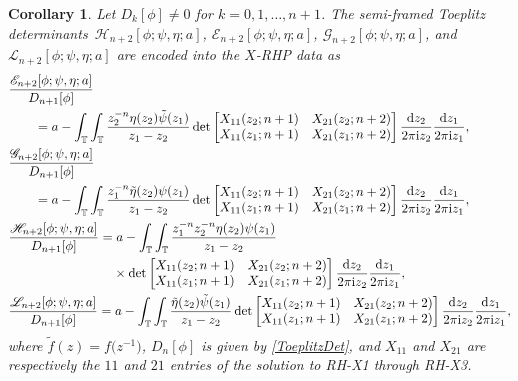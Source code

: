 \documentclass[pdftex]{sigma}
\numberwithin{equation}{section}
\newtheorem{Corollary}[Theorem]{Corollary}
\newcommand{\T}{{\mathbb T}}
\newcommand{\ii}{{\rm i}}
\newcommand{\dd}{{\rm d}}
\begin{document}
	\begin{Corollary}\label{EGL and RHP intro}
		Let $D_k[\phi] \neq 0$ for $k=0,1,\dots, n+1$. The semi-framed Toeplitz determinants~${\mathscr{H}_{n+2}[\phi; \psi, \eta ;a]}$, $\mathscr{E}_{n+2}[\phi; \psi, \eta ;a]$, $\mathscr{G}_{n+2}[\phi; \psi, \eta ;a]$, and $\mathscr{L}_{n+2}[\phi; \psi, \eta ;a]$ are encoded into the $X$-RHP data as
		\begin{align}
& \frac{\mathscr{E}_{n+2}[\phi;\psi, \eta ;a]}{D_{n+1}[\phi]}\nonumber \\
&\qquad= a - \int_{\T} \int_{\T} \frac{z^{-n}_2\eta(z_2) \Tilde{\psi}(z_1)}{z_1-z_2} \det \begin{bmatrix}
				X_{11}(z_2;n+1) & X_{21}(z_2;n+2) \\
				X_{11}(z_1;n+1) & X_{21}(z_1;n+2)
			\end{bmatrix} \frac{\dd z_2}{2 \pi \ii z_2} \frac{\dd z_1}{2 \pi \ii z_1}, 				\label{E and X-RHP} \\
& 		\frac{\mathscr{G}_{n+2}[\phi;\psi, \eta ;a]}{D_{n+1}[\phi]}\nonumber\\
&\qquad = a - \int_{\T} \int_{\T} \frac{z^{-n}_1 \tilde{\eta}(z_2) \psi(z_1)}{z_1-z_2} \det \begin{bmatrix}
				X_{11}(z_2;n+1) & X_{21}(z_2;n+2) \\
				X_{11}(z_1;n+1) & X_{21}(z_1;n+2)
			\end{bmatrix} \frac{\dd z_2}{2 \pi \ii z_2} \frac{\dd z_1}{2 \pi \ii z_1}, 			 \nonumber \\
&	 	\frac{\mathscr{H}_{n+2}[\phi;\psi, \eta ;a]}{D_{n+1}[\phi]}= a - \int_{\T} \int_{\T} \frac{z^{-n}_1z^{-n}_2\eta(z_2) \psi(z_1)}{z_1-z_2}\nonumber\\
&\phantom{\frac{\mathscr{H}_{n+2}[\phi;\psi, \eta ;a]}{D_{n+1}[\phi]}=}{} \times\det \begin{bmatrix}
				X_{11}(z_2;n+1) & X_{21}(z_2;n+2) \\
				X_{11}(z_1;n+1) & X_{21}(z_1;n+2)
			\end{bmatrix} \frac{\dd z_2}{2 \pi \ii z_2} \frac{\dd z_1}{2 \pi \ii z_1}, \label{H and X-RHP} \\
&	 	\frac{\mathscr{L}_{n+2}[\phi;\psi, \eta ;a]}{D_{n+1}[\phi]}= a - \int_{\T} \int_{\T} \frac{ \Tilde{\eta}(z_2) \tilde{\psi}(z_1)}{z_1-z_2} \det \begin{bmatrix}
				X_{11}(z_2;n+1) & X_{21}(z_2;n+2) \\
				X_{11}(z_1;n+1) & X_{21}(z_1;n+2)
			\end{bmatrix} \frac{\dd z_2}{2 \pi \ii z_2} \frac{\dd z_1}{2 \pi \ii z_1}, 				 \nonumber
		\end{align}
		where $\tilde{f}(z) = f\big(z^{-1}\big)$, $D_{n}[\phi]$ is given by \eqref{ToeplitzDet}, and $X_{11}$ and $X_{21}$ are respectively the $11$ and $21$ entries of the solution to {\rm RH-X1} through {\rm RH-X3}.
	\end{Corollary}
	
\end{document}
